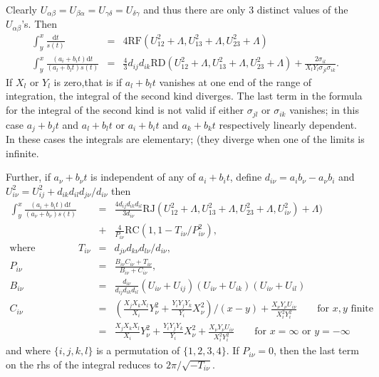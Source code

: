 Clearly $U_{\alpha\beta}=U_{\beta\alpha}=U_{\gamma\delta}=U_{\delta\gamma}$ and thus there
are only 3 distinct values of the $U_{\alpha\beta}$'s. Then
\begin{eqnarray*}
  \int_y^x \frac{\mathrm{d}t}{s(t)} &=& 4\mathrm{RF}(U_{12}^2+\Lambda,
  U_{13}^2+\Lambda, U_{23}^2+\Lambda)\\
\int_y^x\frac{(a_i+b_it)\mathrm{d}t}{(a_l+b_lt)s(t)} &=& \frac{4}{3}d_{ij}d_{ik}
\mathrm{RD}(U_{12}^2+\Lambda, U_{13}^2+\Lambda, U_{23}^2+\Lambda) +
\frac{2\sigma_{il}}{X_lY_l\sigma_{jl}\sigma_{ik}}.
\end{eqnarray*}
If $X_l$ or $Y_l$ is zero,that is if $a_l+b_lt$ vanishes at one end of the range
of integration, the integral of the second kind diverges. The last term in the
formula for the integral of the second kind is not valid if either $\sigma_{jl}$
or $\sigma_{ik}$ vanishes; in this case $a_j+b_jt$ and $a_l+b_lt$ or $a_i+b_it$
and $a_k+b_kt$ respectively linearly dependent.  In these cases the integrals
are elementary; (they diverge when one of the limits is infinite.

Further, if $a_\nu+b_\nu t$ is independent of any of $a_i+b_i t$, define
 $d_{i\nu}=a_ib_\nu-a_\nu b_i$ and $U_{i\nu}^2=U_{ij}^2+d_{ik}d_{il}d_{j\nu}/d_{i\nu}$
then
\begin{eqnarray*}
\int_y^x\frac{(a_i+b_it)\mathrm{d}t}{(a_\nu+b_\nu)s(t)} &=& \frac{4d_{ij}d_{ik}
d_{il}}{3d_{i\nu}}\mathrm{RJ}(U_{12}^2 +\Lambda, U_{13}^2 +\Lambda, U_{23}^2+\Lambda,U_{i\nu}^2) +\Lambda)\\
&+&\frac{4}{P_{i\nu}}\mathrm{RC}(1, 1-T_{i\nu}/P_{i\nu}^2),\\
\mbox{where }\qquad\qquad
T_{i\nu}&=& d_{j\nu}d_{k\nu}d_{l\nu}/d_{i\nu},\\
P_{i\nu}&=& \frac{B_{i\nu}C_{i\nu}+T_{i\nu}}{B_{i\nu}+C_{i\nu}},\\
B_{i\nu} &=& \frac{d_{i\nu}}{d_{ij}d_{ik}d_{il}}(U_{i\nu}+U_{ij})(U_{i\nu}+U_{ik})(U_{i\nu}+U_{il})\\
C_{i\nu} &=& \left(\frac{X_jX_kX_l}{X_i}Y_\nu^2+\frac{Y_iY_jY_k}{Y_i}X_\nu^2\right)/(x-y)+\frac{X_\nu Y_\nu U_{i\nu}}{X_i^2Y_i^2}\qquad \mbox{for }x,y\mbox{ finite}\\
&=& \frac{X_jX_kX_l}{X_i}Y_\nu^2+\frac{Y_iY_jY_k}{Y_i}X_\nu^2+\frac{X_\nu Y_\nu U_{i\nu}}{X_i^2Y_i^2} \qquad \mbox{for } x = \infty \mbox{ or } y = -\infty
\end{eqnarray*}
and where $\{i,j,k,l\}$ is a permutation of $\{1,2,3,4\}$. If $P_{i\nu} =0$, then
the last term on the rhs of the integral reduces to $2\pi/\sqrt{-T_{i\nu}}$.

